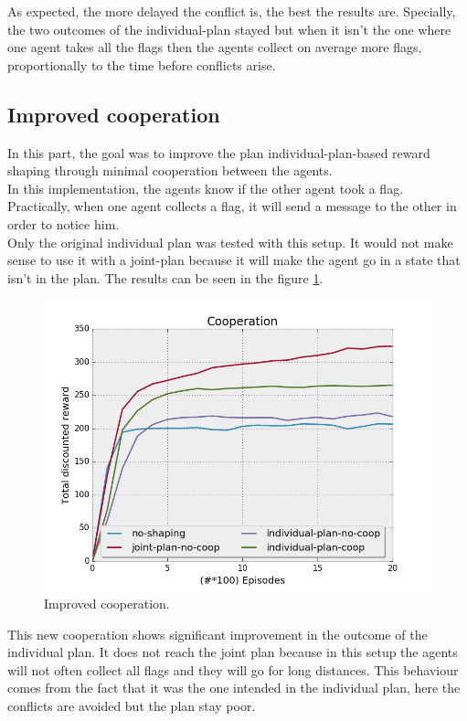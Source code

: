 \documentclass[letterpaper]{article}
\begin{document}
As expected, the more delayed the conflict is, the best the results are. Specially, the two outcomes of the individual-plan stayed but when it isn't the one where one agent takes all the flags then the agents collect on average more flags, proportionally to the time before conflicts arise.

\subsection{Improved cooperation}

In this part, the goal was to improve the plan individual-plan-based reward shaping through minimal cooperation between the agents.\\
In this implementation, the agents know if the other agent took a flag. Practically, when one agent collects a flag, it will send a message to the other in order to notice him.\\
Only the original individual plan was tested with this setup. It would not make sense to use it with a joint-plan because it will make the agent go in a state that isn't in the plan. The results can be seen in the figure \ref{fig:results3}.

\begin{figure}[h!]
  \includegraphics[width=\linewidth]{img/coop.png}
  \caption{Improved cooperation.}
  \label{fig:results3}
\end{figure}

This new cooperation shows significant improvement in the outcome of the individual plan. It does not reach the joint plan because in this setup the agents will not often collect all flags and they will go for long distances. This behaviour comes from the fact that it was the one intended in the individual plan, here the conflicts are avoided but the plan stay poor.
\end{document}
